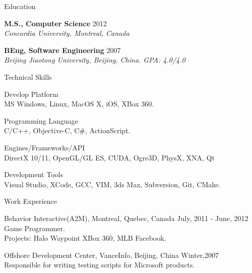 \documentclass[10pt]{article}
\newenvironment{mydescription}{%
    \begin{description}
        \setlength{\itemsep}{0.25em}%
        \setlength{\parsep}{0em}%
        \setlength{\topsep}{\itemsep}%
        \setlength{\parskip}{0em}%
        \setlength{\labelwidth}{0.1em}
        \setlength{\labelsep}{0em} 
    }%
{\end{description}}
\begin{document}
\begin{cv}
\begin{cvlist}{Education}
    \item   \textbf{M.S., Computer Science} \hfill 2012 \\ 
            \emph{Concordia University, Montreal, Canada}
    \item   \textbf{BEng, Software Engineering} \hfill 2007 \\
            \emph{Beijing Jiaotong University, Beijing, China. GPA: 4.0/4.0}
\end{cvlist}

\begin{cvlist}{Technical Skills}
\item
    \begin{mydescription} 
        \item[Develop Platform] \hfill \\
            MS Windows, Linux, MacOS X, iOS, XBox 360.
        \item[Programming Language] \hfill \\
            C/C++, Objective-C, C\#, ActionScript.  
        \item [Engines/Frameworks/API] \hfill \\
             DirectX 10/11, OpenGL/GL ES, CUDA, Ogre3D, PhysX, XNA, Qt
        \item[Development Tools] \hfill \\
            Visual Studio, XCode, GCC, VIM, 3ds Max, Subversion, Git, CMake.
    \end{mydescription} 
\end{cvlist} 




\begin{cvlist}{Work Experience}
\item 
    \begin{mydescription}
		\item[Behavior Interactive(A2M), Montreal, Quebec, Canada] \hfill July, 2011 - June, 2012 \\ 
			Game Programmer. \\ 
			Projects: Halo Waypoint XBox 360, MLB Facebook. 
        	\item[Offshore Development Center, VanceInfo, Beijing, China] \hfill Winter,2007 \\ 
            Responsible for writing testing scripts for Microsoft products. 
    \end{mydescription}
\end{cvlist}


\end{cv}
\end{document}
